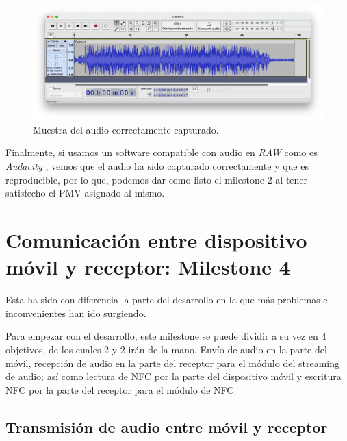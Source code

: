 \begin{figure}[htb]
    \centering
    \includegraphics[width=\textwidth]{fotos/muestra_captura_audacity.png}
    \caption{Muestra del audio correctamente capturado.}
\end{figure}

Finalmente, si usamos un software compatible con audio en \emph{RAW} como es
\emph{Audacity} \cite{software-audacity}, vemos que el audio ha sido capturado
correctamente y que es reproducible, por lo que, podemos dar como listo el
milestone 2 al tener satisfecho el PMV asignado al mismo.

\section{Comunicación entre dispositivo móvil y receptor: Milestone 4}

Esta ha sido con diferencia la parte del desarrollo en la que más problemas e
inconvenientes han ido surgiendo.

Para empezar con el desarrollo, este milestone se puede dividir a su vez en 4
objetivos, de los cuales 2 y 2 irán de la mano. Envío de audio en la parte del
móvil, recepción de audio en la parte del receptor para el módulo del streaming
de audio; así como lectura de NFC por la parte del dispositivo móvil y escritura
NFC por la parte del receptor para el módulo de NFC.

\subsection{Transmisión de audio entre móvil y receptor}

